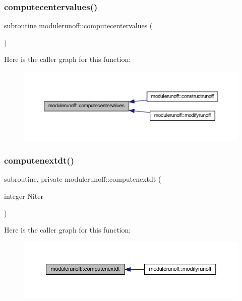 \subsubsection{\texorpdfstring{computecentervalues()}{computecentervalues()}}
{\footnotesize\ttfamily subroutine modulerunoff\+::computecentervalues (\begin{DoxyParamCaption}{ }\end{DoxyParamCaption})\hspace{0.3cm}{\ttfamily [private]}}

Here is the caller graph for this function\+:\nopagebreak
\begin{figure}[H]
\begin{center}
\leavevmode
\includegraphics[width=350pt]{namespacemodulerunoff_a922ce27a6758e75221357b9572099e5a_icgraph}
\end{center}
\end{figure}
\mbox{\label{namespacemodulerunoff_a7e93c436177a4089e806a4f1fdeedc77}} 
\subsubsection{\texorpdfstring{computenextdt()}{computenextdt()}}
{\footnotesize\ttfamily subroutine, private modulerunoff\+::computenextdt (\begin{DoxyParamCaption}\item[{integer}]{Niter }\end{DoxyParamCaption})\hspace{0.3cm}{\ttfamily [private]}}

Here is the caller graph for this function\+:\nopagebreak
\begin{figure}[H]
\begin{center}
\leavevmode
\includegraphics[width=350pt]{namespacemodulerunoff_a7e93c436177a4089e806a4f1fdeedc77_icgraph}
\end{center}
\end{figure}
\mbox{\label{namespacemodulerunoff_a7d3fe3f8c8fecb1a73f35d1963f7b2b5}} 
